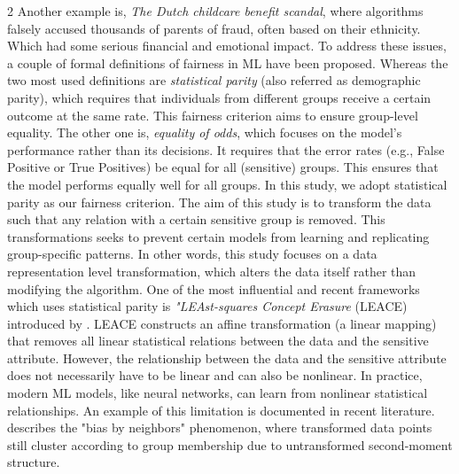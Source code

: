 \documentclass[ecta,nameyear,final]{econsocart}
\numberwithin{equation}{section}
\theoremstyle{plain}
\theoremstyle{definition}
\begin{document}
\begin{multicols}{2}
\newline \newline
Another example is, \emph{The Dutch childcare benefit scandal}, where algorithms falsely accused thousands of parents of fraud, often based on their ethnicity. Which had some serious financial and emotional impact.
\newline \newline
To address these issues, a couple of formal definitions of fairness in ML have been proposed. Whereas the two most used definitions are \emph{statistical parity} (also referred as demographic parity), which requires that individuals from different groups receive a certain outcome at the same rate. This fairness criterion aims to ensure group-level equality. The other one is, \emph{equality of odds}, which focuses on the model's performance rather than its decisions. It requires that the error rates (e.g., False Positive or True Positives) be equal for all (sensitive) groups. This ensures that the model performs equally well for all groups.
\newline \newline
In this study, we adopt statistical parity as our fairness criterion. The aim of this study is to transform the data such that any relation with a certain sensitive group is removed. This transformations seeks to prevent certain models from learning and replicating group-specific patterns.
\newline \newline
In other words, this study focuses on a data representation level transformation, which alters the data itself rather than modifying the algorithm.
\newline \newline
One of the most influential and recent frameworks which uses statistical parity is \emph{"LEAst-squares Concept Erasure} (LEACE) introduced by \cite{Belrose2023}. LEACE constructs an affine transformation (a linear mapping) that removes all linear statistical relations between the data and the sensitive attribute.
\newline \newline
However, the relationship between the data and the sensitive attribute does not necessarily have to be linear and can also be nonlinear. In practice, modern ML models, like neural networks, can learn from nonlinear statistical relationships.
\newline \newline
An example of this limitation is documented in recent literature. \cite{gonen-goldberg-2019-lipstick} describes the "bias by neighbors" phenomenon, where transformed data points still cluster according to group membership due to untransformed second-moment structure.

\end{multicols}
\end{document}
